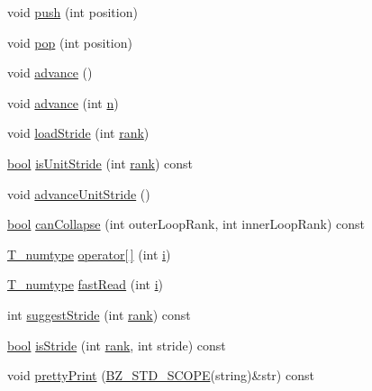\begin{DoxyCompactItemize}
void \hyperlink{class__bz__ArrayExpr_aaeb603362dfae914912450edac59c583}{push} (int position)
\item 
void \hyperlink{class__bz__ArrayExpr_a41b169438e35cdea2f4404ecf456776c}{pop} (int position)
\item 
void \hyperlink{class__bz__ArrayExpr_a1247ac0df6a9a1b6bcb74d93d93331fa}{advance} ()
\item 
void \hyperlink{class__bz__ArrayExpr_a3c3409aecca3f905165410ddd99dd4c6}{advance} (int \hyperlink{indexexpr_8h_ab427e2e2b4d6cec55fa088ea2a692ace}{n})
\item 
void \hyperlink{class__bz__ArrayExpr_a99525e24637d81c57ce08ce274cc3e87}{load\+Stride} (int \hyperlink{class__bz__ArrayExpr_aba2f516b84f2a7a0c04e0d01dbba3fd3}{rank})
\item 
\hyperlink{compiler_8h_abb452686968e48b67397da5f97445f5b}{bool} \hyperlink{class__bz__ArrayExpr_a15654fbf8fa2c789b61b3e6a633a5c48}{is\+Unit\+Stride} (int \hyperlink{class__bz__ArrayExpr_aba2f516b84f2a7a0c04e0d01dbba3fd3}{rank}) const 
\item 
void \hyperlink{class__bz__ArrayExpr_a52d7287bb733638729ed44e59b037ba6}{advance\+Unit\+Stride} ()
\item 
\hyperlink{compiler_8h_abb452686968e48b67397da5f97445f5b}{bool} \hyperlink{class__bz__ArrayExpr_a50bf18385ec6d2c0baee55ecdb7bf2a1}{can\+Collapse} (int outer\+Loop\+Rank, int inner\+Loop\+Rank) const 
\item 
\hyperlink{class__bz__ArrayExpr_afa1ec55de102cafbc549da90093af10b}{T\+\_\+numtype} \hyperlink{class__bz__ArrayExpr_a208e0ccc205d2551e28d8680e8e7dcea}{operator\mbox{[}$\,$\mbox{]}} (int \hyperlink{indexexpr_8h_aabd77643995707c185e95c8cb2782c81}{i})
\item 
\hyperlink{class__bz__ArrayExpr_afa1ec55de102cafbc549da90093af10b}{T\+\_\+numtype} \hyperlink{class__bz__ArrayExpr_a571662b4c9bf44bc0f4b81ad7f6e23ba}{fast\+Read} (int \hyperlink{indexexpr_8h_aabd77643995707c185e95c8cb2782c81}{i})
\item 
int \hyperlink{class__bz__ArrayExpr_a343553aaef6f416fc2b995105e5faa0b}{suggest\+Stride} (int \hyperlink{class__bz__ArrayExpr_aba2f516b84f2a7a0c04e0d01dbba3fd3}{rank}) const 
\item 
\hyperlink{compiler_8h_abb452686968e48b67397da5f97445f5b}{bool} \hyperlink{class__bz__ArrayExpr_a29d5ef07aa821873cb41fb41c897b38e}{is\+Stride} (int \hyperlink{class__bz__ArrayExpr_aba2f516b84f2a7a0c04e0d01dbba3fd3}{rank}, int stride) const 
\item 
void \hyperlink{class__bz__ArrayExpr_a44adbb6ebb0120d3009c1dffc8147ab4}{pretty\+Print} (\hyperlink{numinquire_8h_a2b24ffc3b4ef9803956bc7715c6c7b83}{B\+Z\+\_\+\+S\+T\+D\+\_\+\+S\+C\+O\+P\+E}(string)\&str) const 

\end{DoxyCompactItemize}
